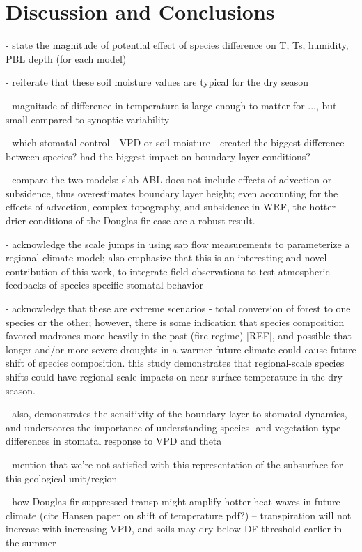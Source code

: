\linespread{1.6}\selectfont

\section{Discussion and Conclusions}
- state the magnitude of potential effect of species difference on T, Ts, humidity, PBL depth (for each model)

- reiterate that these soil moisture values are typical for the dry season

- magnitude of difference in temperature is large enough to matter for ..., but small compared to synoptic variability

- which stomatal control - VPD or soil moisture - created the biggest difference between species?  had the biggest impact on boundary layer conditions?

- compare the two models: slab ABL does not include effects of advection or subsidence, thus overestimates boundary layer height; even accounting for the effects of advection, complex topography, and subsidence in WRF, the hotter drier conditions of the Douglas-fir case are a robust result.

- acknowledge the scale jumps in using sap flow measurements to parameterize a regional climate model; also emphasize that this is an interesting and novel contribution of this work, to integrate field observations to test atmospheric feedbacks of species-specific stomatal behavior

- acknowledge that these are extreme scenarios - total conversion of forest to one species or the other; however, there is some indication that species composition favored madrones more heavily in the past (fire regime) [REF], and possible that longer and/or more severe droughts in a warmer future climate could cause future shift of species composition.  this study demonstrates that regional-scale species shifts could have regional-scale impacts on near-surface temperature in the dry season.

- also, demonstrates the sensitivity of the boundary layer to stomatal dynamics, and underscores the importance of understanding species- and vegetation-type-differences in stomatal response to VPD and theta

- mention that we’re not satisfied with this representation of the subsurface for this geological unit/region

- how Douglas fir suppressed transp might amplify hotter heat waves in future climate (cite Hansen paper on shift of temperature pdf?) – transpiration will not increase with increasing VPD, and soils may dry below DF threshold earlier in the summer
